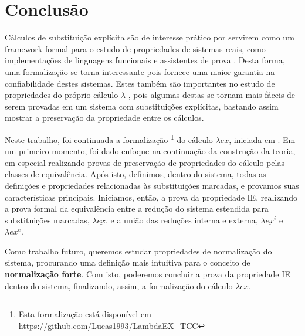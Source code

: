 \chapter{Conclusão}

Cálculos de substituição explícita são de interesse prático por servirem como um
framework formal para o estudo de propriedades de sistemas reais, como
implementações de linguagens funcionais e assistentes de prova \cite{levy1999}.
Desta forma, uma formalização se torna interessante pois fornece uma maior
garantia na confiabilidade destes sistemas. Estes também são importantes no
estudo de propriedades do próprio cálculo $\lambda$ \cite{ben_cbv, ben_beta},
pois algumas destas se tornam mais fáceis de serem provadas em um sistema com
substituições explícitas, bastando assim mostrar a preservação da propriedade
entre os cálculos.

Neste trabalho, foi continuada a formalização \footnote{ Esta formalização está
    disponível em \url{https://github.com/Lucas1993/LambdaEX_TCC}} do cálculo
$\lambda ex$, iniciada em \cite{initial}. Em um primeiro momento, foi dado
enfoque na continuação da construção da teoria, em especial realizando provas de
preservação de propriedades do cálculo pelas classes de equivalência. Após isto,
definimos, dentro do sistema, todas as definições e propriedades relacionadas às
substituições marcadas, e provamos suas características principais. Iniciamos,
então, a prova da propriedade IE, realizando a prova formal da equivalência
entre a redução do sistema estendida para substituições marcadas, $\lambda
\underline{ex}$, e a união das reduções interna e externa, $\lambda
\underline{ex}^i$ e $\lambda \underline{ex}^e$.

Como trabalho futuro, queremos estudar propriedades de normalização do sistema,
procurando uma definição mais intuitiva para o conceito de \textbf{normalização
forte}. Com isto, poderemos concluir a prova da propriedade IE dentro do
sistema, finalizando, assim, a formalização do cálculo $\lambda ex$.

